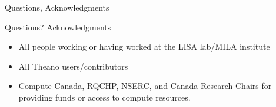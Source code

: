 \documentclass[utf8x,xcolor=pdftex,dvipsnames,table]{beamer}
\begin{document}
\begin{frame}{Questions, Acknowledgments}
\Huge
\begin{center}
Questions?\newline
Acknowledgments
\end{center}
\normalsize
\begin{itemize}
\item All people working or having worked at the LISA lab/MILA institute
\item All Theano users/contributors
\item Compute Canada, RQCHP, NSERC, and Canada Research Chairs for providing funds or access to compute resources.
\end{itemize}

\end{frame}
\end{document}
